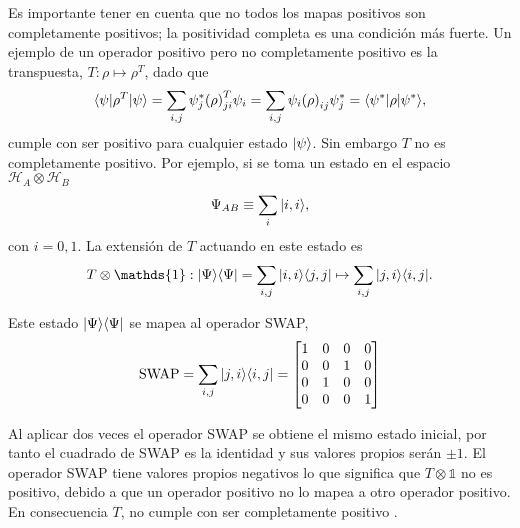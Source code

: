 Es importante tener en cuenta que no todos los mapas positivos son
completamente positivos; la positividad completa es una condición más fuerte.
Un ejemplo de un operador positivo pero no completamente positivo es la
transpuesta, $T:\rho \mapsto {\rho}^T$, dado que \[\langle \psi |{\rho}^T| \psi
\rangle=\sum_{i,j} \psi _j^* {(\rho)}^T _{ji} \psi _i=\sum _{i,j} \psi _i{(\rho)}
_{ij} \psi_j^{*}=\langle {\psi}^*|\rho|\psi ^*\rangle,\] cumple con ser positivo para
cualquier estado $| \psi \rangle$. Sin embargo $ {T} $ no es completamente
positivo. Por ejemplo,  si se toma un estado en el espacio $\mathcal{H}_A\otimes \mathcal{H}_B$ \[\Psi_{AB} \equiv \sum_i
|i,i\rangle, \]con $i=0,1$. La extensión de $T$ actuando en este estado es \[T \otimes
\mathds{1}:|\Psi\rala \Psi|=\sum_{i,j}|i,i\rala j,j| \mapsto
\sum_{i,j}|j,i\rala i,j|.\]

Este estado $|\Psi\rangle \langle \Psi|$ se mapea al operador SWAP,
\begin{equation}
    \text{SWAP}=\sum_{i,j}|j,i\rangle \langle i,j|=\begin{bmatrix}
        1&0&0&0\\
        0&0&1&0\\
        0&1&0&0\\
        0&0&0&1\\
    \end{bmatrix}
\end{equation}


 Al aplicar dos veces el operador SWAP se obtiene el mismo estado inicial, por tanto el cuadrado de SWAP es la identidad y sus valores propios serán $\pm 1$. El operador SWAP tiene valores propios negativos lo que significa que $T \otimes \mathds{1}$ no es positivo, debido a que un operador positivo no lo mapea a otro operador positivo. En consecuencia $T$, no cumple con ser completamente positivo  {\cite{preskill2020quantum}}.




